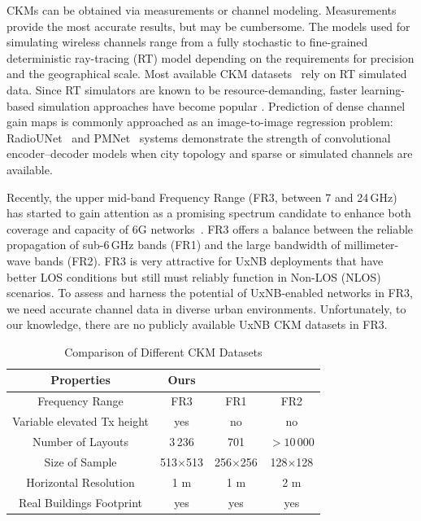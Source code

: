 \documentclass[10pt,conference,letterpaper]{IEEEtran}
\begin{document}
CKMs can be obtained via measurements or channel modeling. Measurements provide the most accurate results, but may be cumbersome. The models used for simulating wireless channels range from a fully stochastic to fine-grained deterministic ray-tracing (RT) model depending on the requirements for precision and the geographical scale. Most available CKM datasets~\cite{dataset2212,ckmimagenet2025} rely on RT simulated data. Since RT simulators are known to be resource-demanding, faster learning-based simulation approaches have become popular \cite{Chen2017rem,radiounet2020,pmnet2023, pmnet_icassp2023}. Prediction of dense channel gain maps is commonly approached as an image-to-image regression problem: RadioUNet~\cite{radiounet2020} and PMNet~\cite{pmnet2023, pmnet_icassp2023} systems demonstrate the strength of convolutional encoder--decoder models when city topology and sparse or simulated channels are available. 

Recently, the upper mid-band Frequency Range (FR3, between 7 and 24\,GHz) has started to gain attention as a promising spectrum candidate to enhance both coverage and capacity of 6G networks~\cite{Cui2024}. FR3 offers a balance between the reliable propagation of sub-6\,GHz bands (FR1) and the large bandwidth of millimeter-wave bands (FR2). FR3 is very attractive for UxNB deployments that have better LOS conditions but still must reliably function in Non-LOS (NLOS) scenarios.  To assess and harness the potential of UxNB-enabled networks in FR3, we need accurate channel data in diverse urban environments. Unfortunately, to our knowledge, there are no publicly available UxNB CKM datasets in FR3.

\begin{table}[b]
\vspace{-15pt}
\centering
\caption{Comparison of Different CKM Datasets}
\vspace{-2pt}
\begin{tabular}{@{}c|c|c|c@{}}
\toprule
Properties  & Ours   &  \cite{dataset2212}  &  \cite{ckmimagenet2025} \\ \hline 
Frequency Range & FR3   & FR1 & FR2\\ \hline 
Variable elevated Tx height & yes   & no & no\\ \hline 
Number of Layouts & 3\,236  & 701  & $>10\,000$ \\ \hline 
Size of Sample  & 513$\times$513& 256$\times$256  & 128$\times$128 \\  \hline 
Horizontal Resolution & 1 m & 1 m  & 2 m\\ \hline 
Real Buildings Footprint  & yes   & yes     & yes \\  \hline 
\bottomrule
\end{tabular}
\label{tab:datasets}
\end{table}
\end{document}
